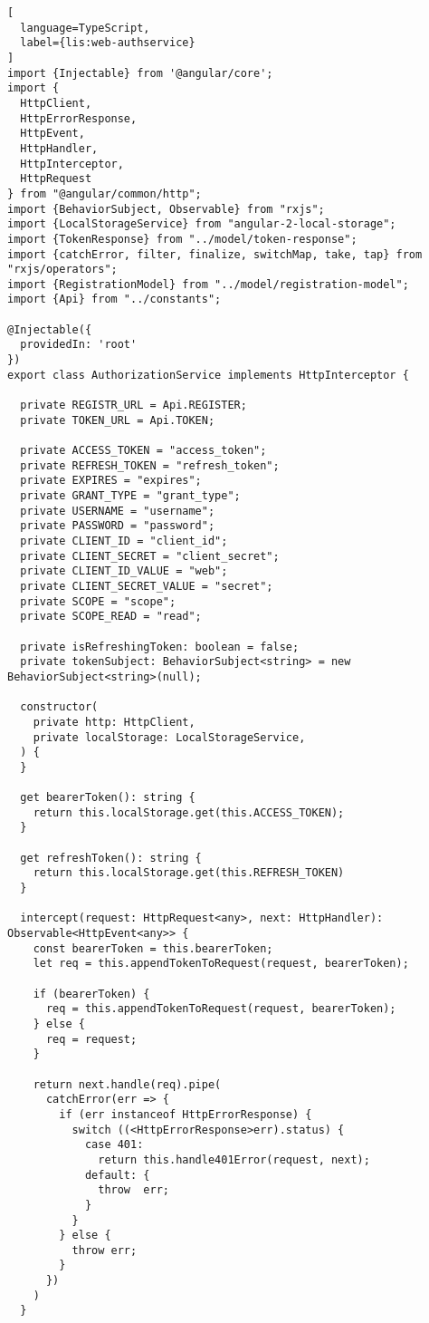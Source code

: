 \begin{lstlisting}[
  language=TypeScript,
  label={lis:web-authservice}
]
import {Injectable} from '@angular/core';
import {
  HttpClient,
  HttpErrorResponse,
  HttpEvent,
  HttpHandler,
  HttpInterceptor,
  HttpRequest
} from "@angular/common/http";
import {BehaviorSubject, Observable} from "rxjs";
import {LocalStorageService} from "angular-2-local-storage";
import {TokenResponse} from "../model/token-response";
import {catchError, filter, finalize, switchMap, take, tap} from "rxjs/operators";
import {RegistrationModel} from "../model/registration-model";
import {Api} from "../constants";

@Injectable({
  providedIn: 'root'
})
export class AuthorizationService implements HttpInterceptor {

  private REGISTR_URL = Api.REGISTER;
  private TOKEN_URL = Api.TOKEN;

  private ACCESS_TOKEN = "access_token";
  private REFRESH_TOKEN = "refresh_token";
  private EXPIRES = "expires";
  private GRANT_TYPE = "grant_type";
  private USERNAME = "username";
  private PASSWORD = "password";
  private CLIENT_ID = "client_id";
  private CLIENT_SECRET = "client_secret";
  private CLIENT_ID_VALUE = "web";
  private CLIENT_SECRET_VALUE = "secret";
  private SCOPE = "scope";
  private SCOPE_READ = "read";

  private isRefreshingToken: boolean = false;
  private tokenSubject: BehaviorSubject<string> = new BehaviorSubject<string>(null);

  constructor(
    private http: HttpClient,
    private localStorage: LocalStorageService,
  ) {
  }

  get bearerToken(): string {
    return this.localStorage.get(this.ACCESS_TOKEN);
  }

  get refreshToken(): string {
    return this.localStorage.get(this.REFRESH_TOKEN)
  }

  intercept(request: HttpRequest<any>, next: HttpHandler): Observable<HttpEvent<any>> {
    const bearerToken = this.bearerToken;
    let req = this.appendTokenToRequest(request, bearerToken);

    if (bearerToken) {
      req = this.appendTokenToRequest(request, bearerToken);
    } else {
      req = request;
    }

    return next.handle(req).pipe(
      catchError(err => {
        if (err instanceof HttpErrorResponse) {
          switch ((<HttpErrorResponse>err).status) {
            case 401:
              return this.handle401Error(request, next);
            default: {
              throw  err;
            }
          }
        } else {
          throw err;
        }
      })
    )
  }


\end{lstlisting}
